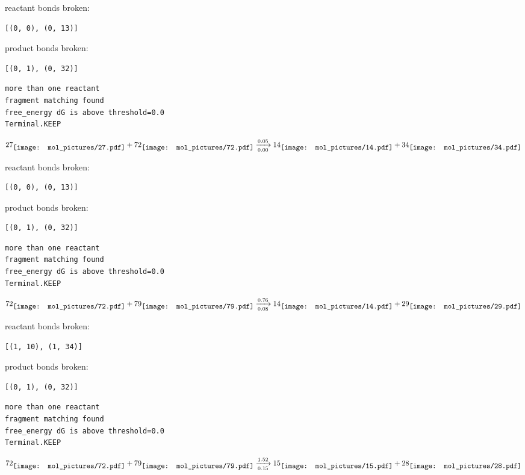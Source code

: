 \documentclass{article}
\begin{document}
reactant bonds broken:\begin{verbatim}
[(0, 0), (0, 13)]
\end{verbatim}
product bonds broken:\begin{verbatim}
[(0, 1), (0, 32)]
\end{verbatim}




\vspace{1cm}
\begin{verbatim}
more than one reactant
fragment matching found
free_energy dG is above threshold=0.0
Terminal.KEEP
\end{verbatim}
$$
27
\raisebox{-.5\height}{\texttt{[image: mol\_pictures/27.pdf]}}
+
72
\raisebox{-.5\height}{\texttt{[image: mol\_pictures/72.pdf]}}
\xrightarrow[0.00]{0.05}
14
\raisebox{-.5\height}{\texttt{[image: mol\_pictures/14.pdf]}}
+
34
\raisebox{-.5\height}{\texttt{[image: mol\_pictures/34.pdf]}}
$$


reactant bonds broken:\begin{verbatim}
[(0, 0), (0, 13)]
\end{verbatim}
product bonds broken:\begin{verbatim}
[(0, 1), (0, 32)]
\end{verbatim}




\vspace{1cm}
\begin{verbatim}
more than one reactant
fragment matching found
free_energy dG is above threshold=0.0
Terminal.KEEP
\end{verbatim}
$$
72
\raisebox{-.5\height}{\texttt{[image: mol\_pictures/72.pdf]}}
+
79
\raisebox{-.5\height}{\texttt{[image: mol\_pictures/79.pdf]}}
\xrightarrow[0.08]{0.76}
14
\raisebox{-.5\height}{\texttt{[image: mol\_pictures/14.pdf]}}
+
29
\raisebox{-.5\height}{\texttt{[image: mol\_pictures/29.pdf]}}
$$


reactant bonds broken:\begin{verbatim}
[(1, 10), (1, 34)]
\end{verbatim}
product bonds broken:\begin{verbatim}
[(0, 1), (0, 32)]
\end{verbatim}




\vspace{1cm}
\begin{verbatim}
more than one reactant
fragment matching found
free_energy dG is above threshold=0.0
Terminal.KEEP
\end{verbatim}
$$
72
\raisebox{-.5\height}{\texttt{[image: mol\_pictures/72.pdf]}}
+
79
\raisebox{-.5\height}{\texttt{[image: mol\_pictures/79.pdf]}}
\xrightarrow[0.15]{1.52}
15
\raisebox{-.5\height}{\texttt{[image: mol\_pictures/15.pdf]}}
+
28
\raisebox{-.5\height}{\texttt{[image: mol\_pictures/28.pdf]}}
$$
\end{document}
